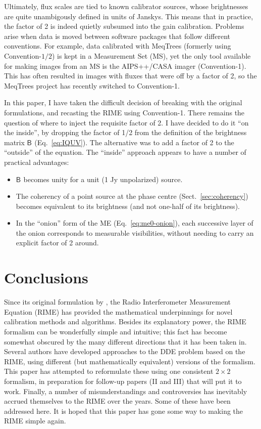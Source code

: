\documentclass[referee]{aa}
\newcommand{\coh}[2]{\mathsf{{#1}}_{{#2}}}
\begin{document}
Ultimately, flux scales are tied to known calibrator sources, whose brightnesses are quite unambigously defined in units of Janskys. This means that in practice, the factor of 2 is indeed quietly subsumed into the gain calibration. Problems arise when data is moved between software packages that follow different conventions. For example, data calibrated with MeqTrees (formerly using  Convention-$\scriptstyle 1/2$) is kept in a Measurement Set (MS), yet the only tool available for making images from an MS is the AIPS++/CASA imager (Convention-1). This has often resulted in images with fluxes that were off by a factor of 2, so the MeqTrees project has recently switched to Convention-1.

In this paper, I have taken the difficult decision of breaking with the original formulations, and recasting the RIME using Convention-1. There remains the question of where to inject the requisite factor of 2. I have decided to do it ``on the inside'', by dropping the factor of 1/2 from the \citet{ME4} definition of the brightness matrix $\coh{B}{}$ (Eq.~\ref{eq:IQUV}). The alternative was to add a factor of 2 to the ``outside'' of the equation. The ``inside'' approach appears to have a number of practical advantages:

\begin{itemize}
\item $\coh{B}{}$ becomes unity for a unit (1 Jy unpolarized) source.
\item The coherency of a point source at the phase centre (Sect.~\ref{sec:coherency}) becomes equivalent to its brightness (and not one-half of its brightness).
\item In the ``onion'' form of the ME (Eq.~\ref{eq:me0-onion}), each successive layer of the onion corresponds to measurable visibilities, without needing to carry an explicit factor of 2 around.
\end{itemize}

\section{Conclusions}

Since its original formulation by \citet{ME1}, the Radio Interferometer Measurement Equation (RIME) has provided the mathematical underpinnings for novel calibration methods and algorithms. Besides its explanatory power, the RIME formalism can be wonderfully simple and intuitive; this fact has become somewhat obscured by the many different directions that it has been taken in. Several authors have developed approaches to the DDE problem based on the RIME, using different (but mathematically equivalent) versions of the formalism. This paper has attempted to reformulate these using one consistent $2\times2$ formalism, in preparation for follow-up papers (II and III) that will put it to work. Finally, a number of misunderstandings and controversies has inevitably accrued themselves to the RIME over the years. Some of these have been addressed here. It is hoped that this paper has gone some way to making the RIME simple again. 




\end{document}

